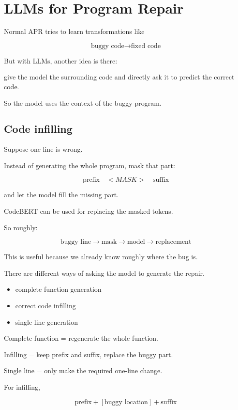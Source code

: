 \documentclass[11pt]{book}
\begin{document}
\setcounter{chapter}{6}
\chapter{LLMs for Program Repair}

Normal APR tries to learn transformations like

\[
\text{buggy code} \rightarrow \text{fixed code}
\]

But with LLMs, another idea is there:

give the model the surrounding code and directly ask
it to predict the correct code.

So the model uses the context of the buggy program.

\section{Code infilling}

Suppose one line is wrong.

Instead of generating the whole program, mask that part:

\[
\text{prefix} \quad <MASK> \quad \text{suffix}
\]

and let the model fill the missing part.

CodeBERT can be used for replacing the masked tokens.

So roughly:

\[
\text{buggy line}
\rightarrow
\text{mask}
\rightarrow
\text{model}
\rightarrow
\text{replacement}
\]

This is useful because we already know roughly where
the bug is.

There are different ways of asking the model to
generate the repair.

\begin{itemize}
    \item complete function generation
    \item correct code infilling
    \item single line generation
\end{itemize}

Complete function = regenerate the whole function.

Infilling = keep prefix and suffix, replace the
buggy part.

Single line = only make the required one-line change.

For infilling,

\[
\boxed{
\text{prefix} + [\text{buggy location}] + \text{suffix}
}
\]
\end{document}
